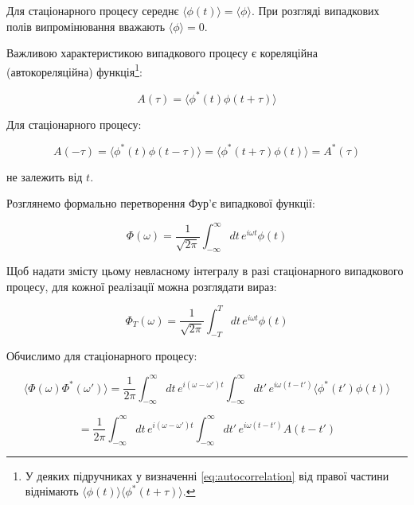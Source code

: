 Для стаціонарного процесу середнє \(\langle \phi(t) \rangle = \langle \phi \rangle\). При розгляді випадкових полів випромінювання вважають \(\langle
\phi \rangle = 0\).

Важливою характеристикою випадкового процесу є кореляційна (автокореляційна) функція\footnote{У деяких підручниках у визначенні
\eqref{eq:autocorrelation} від правої частини віднімають \(\langle \phi(t) \rangle \langle \phi^{*}(t + \tau) \rangle\).}:

\begin{equation}
A(\tau) = \langle \phi^{*}(t) \phi(t + \tau) \rangle
\label{eq:autocorrelation}
\end{equation}

Для стаціонарного процесу:

\begin{equation*}
A(-\tau) = \langle \phi^{*}(t) \phi(t - \tau) \rangle = \langle \phi^{*}(t + \tau) \phi(t) \rangle = A^{*}(\tau)
\end{equation*}

не залежить від \(t\).

Розглянемо формально перетворення Фур'є випадкової функції:

\begin{equation*}
\Phi(\omega) = \frac{1}{\sqrt{2\pi}} \int_{-\infty}^{\infty} dt \, e^{i\omega t} \phi(t)
\end{equation*}

Щоб надати змісту цьому невласному інтегралу в разі стаціонарного випадкового процесу, для кожної реалізації можна розглядати вираз:

\begin{equation*}
\Phi_T(\omega) = \frac{1}{\sqrt{2\pi}} \int_{-T}^{T} dt \, e^{i\omega t} \phi(t)
\end{equation*}

Обчислимо для стаціонарного процесу:

\begin{equation*}
\langle \Phi(\omega) \Phi^{*}(\omega') \rangle = \frac{1}{2\pi} \int_{-\infty}^{\infty} dt \, e^{i(\omega - \omega')t} \int_{-\infty}^{\infty} dt' \,
e^{i\omega(t - t')} \langle \phi^{*}(t') \phi(t) \rangle
\end{equation*}

\begin{equation*}
= \frac{1}{2\pi} \int_{-\infty}^{\infty} dt \, e^{i(\omega - \omega')t} \int_{-\infty}^{\infty} dt' \, e^{i\omega(t - t')} A(t - t')
\end{equation*}

